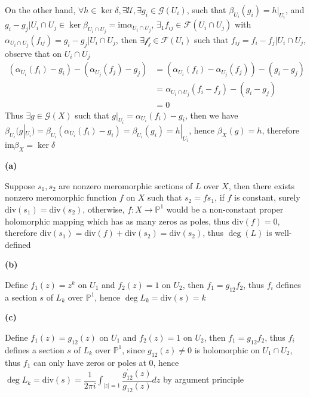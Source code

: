 \documentclass[../main.tex]{subfiles}
\begin{document}
\begin{problem}
On the other hand, $\forall h\in \ker\delta, \exists\mathcal{U}, \exists g_{i}\in \mathcal{G}(U_{i})$, such that $\beta_{U_{i}}(g_{i})=h|_{U_{i}}$, and $g_{i}-g_{j}|U_{i}\cap U_{j}\in\ker\beta_{U_{i}\cap U_{j}}=\mathrm{im}\alpha_{U_{i}\cap U_{j}}$, $\exists_{1}f_{ij}\in\mathcal{F}(U_{i}\cap U_{j})$ with $\alpha_{U_{i}\cap U_{j}}(f_{ij})=g_{i}-g_{j}|U_{i}\cap U_{j}$, then $\exists\mathcal{f_{i}}\in\mathcal{F}(U_{i})$ such that $f_{ij}=f_{i}-f_{j}|U_{i}\cap U_{j}$, observe that on $U_{i}\cap U_{j}$
\[
\begin{aligned}
\left(\alpha_{U_{i}}(f_{i})-g_{i}\right)-\left(\alpha_{U_{j}}(f_{j})-g_{j}\right)
&=\left(\alpha_{U_{i}}(f_{i})-\alpha_{U_{j}}(f_{j})\right)-\left(g_{i}-g_{j}\right) \\
&=\alpha_{U_{i}\cap U_{j}}(f_{i}-f_{j})-\left(g_{i}-g_{j}\right) \\
&=0
\end{aligned}
\]
Thus $\exists g\in \mathcal{G}(X)$ such that $g|_{U_{i}}=\alpha_{U_{i}}(f_{i})-g_{i}$, then we have $\beta_{U_{i}}(g|_{U_{i}})=\beta_{U_{i}}(\alpha_{U_{i}}(f_{i})-g_{i})=\beta_{U_{i}}(g_{i})=h|_{U_{i}}$, hence $\beta_{X}(g)=h$, therefore $\mathrm{im}\beta_{X}=\ker\delta$ 
\end{problem}

\begin{problem}
\textbf{(a)} \par
Suppose $s_{1},s_{2}$ are nonzero meromorphic sections of $L$ over $X$, then there exists nonzero meromorphic function $f$ on $X$ such that $s_{2}=fs_{1}$, if $f$ is constant, surely $\mathrm{div}(s_{1})=\mathrm{div}(s_{2})$, otherwise, $f: X\rightarrow\mathbb{P}^{1}$ would be a non-constant proper holomorphic mapping which has as many zeros as poles, thus $\mathrm{div}(f)=0$, therefore $\mathrm{div}(s_{1})=\mathrm{div}(f)+\mathrm{div}(s_{2})=\mathrm{div}(s_{2})$, thus $\deg (L)$ is well-defined \par
\textbf{(b)} \par
Define $f_{1}(z)=z^{k}$ on $U_{1}$ and $f_{2}(z)=1$ on $U_{2}$, then $f_{1}=g_{12}f_{2}$, thus $f_{i}$ defines a section $s$ of $L_{k}$ over $\mathbb{P}^{1}$, hence $\deg L_{k}=\mathrm{div}(s)=k$ \par
\textbf{(c)} \par
Define $f_{1}(z)=g_{12}(z)$ on $U_{1}$ and $f_{2}(z)=1$ on $U_{2}$, then $f_{1}=g_{12}f_{2}$, thus $f_{i}$ defines a section $s$ of $L_{k}$ over $\mathbb{P}^{1}$, since $g_{12}(z)\neq 0$ is holomorphic on $U_{1}\cap U_{2}$, thus $f_{1}$ can only have zeros or poles at $0$, hence $\deg L_{k}=\mathrm{div}(s)=\dfrac{1}{2\pi i}\displaystyle{\int_{|z|=1}}\dfrac{g_{12}^{'}(z)}{g_{12}(z)}dz$ by argument principle
\end{problem}
\end{document}
